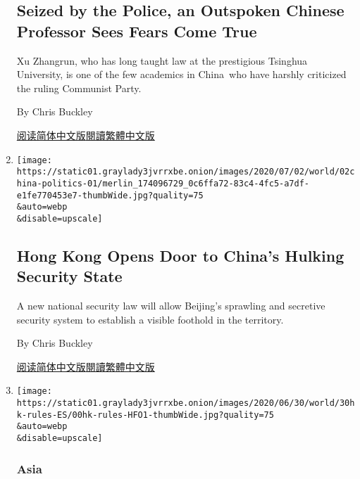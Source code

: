 \begin{enumerate}
{  \subsection{Seized by the Police, an Outspoken Chinese Professor Sees
  Fears Come
  True}\label{seized-by-the-police-an-outspoken-chinese-professor-sees-fears-come-true}}

  Xu Zhangrun, who has long taught law at the prestigious Tsinghua
  University, is one of the few academics in China~who have harshly
  criticized the ruling Communist Party.

  By Chris Buckley

  \href{https://cn.nytimes3xbfgragh.onion/china/20200706/china-detains-xu-zhangrun-critic/}{阅读简体中文版}\href{https://cn.nytimes3xbfgragh.onion/china/20200706/china-detains-xu-zhangrun-critic/zh-hant/}{閱讀繁體中文版}
\item
  \href{/2020/07/02/world/asia/hong-kong-security-china.html}{}

  \texttt{[image: https://static01.graylady3jvrrxbe.onion/images/2020/07/02/world/02china-politics-01/merlin\_174096729\_0c6ffa72-83c4-4fc5-a7df-e1fe770453e7-thumbWide.jpg?quality=75\\\&auto=webp\\\&disable=upscale]}

  \hypertarget{hong-kong-opens-door-to-chinas-hulking-security-state}{%
  \subsection{Hong Kong Opens Door to China's Hulking Security
  State}\label{hong-kong-opens-door-to-chinas-hulking-security-state}}

  A new national security law will allow Beijing's sprawling and
  secretive security system to establish a visible foothold in the
  territory.

  By Chris Buckley

  \href{https://cn.nytimes3xbfgragh.onion/china/20200703/hong-kong-security-china/}{阅读简体中文版}\href{https://cn.nytimes3xbfgragh.onion/china/20200703/hong-kong-security-china/zh-hant/}{閱讀繁體中文版}
\item
  \href{/es/2020/06/30/espanol/mundo/hong-kong-china-leyes-seguridad.html}{}

  \texttt{[image: https://static01.graylady3jvrrxbe.onion/images/2020/06/30/world/30hk-rules-ES/00hk-rules-HFO1-thumbWide.jpg?quality=75\\\&auto=webp\\\&disable=upscale]}

  \hypertarget{asia}{%
  \subsubsection{Asia}\label{asia}}


\end{enumerate}
